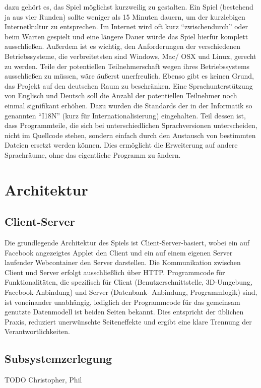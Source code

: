 \documentclass[a4paper,12pt]{scrartcl}
\begin{document}
dazu gehört es, das Spiel möglichst kurzweilig zu gestalten. Ein Spiel (bestehend ja aus
vier Runden) sollte weniger als 15 Minuten dauern, um der kurzlebigen Internetkultur zu
entsprechen. Im Internet wird oft kurz "`zwischendurch"' oder beim Warten gespielt und eine
längere Dauer würde das Spiel hierfür komplett ausschließen. Außerdem ist es wichtig, den
Anforderungen der verschiedenen Betriebssysteme, die verbreitetsten sind Windows, Mac/
OSX und Linux, gerecht zu werden. Teile der potentiellen Teilnehmerschaft wegen ihres
Betriebssystems ausschließen zu müssen, wäre äußerst unerfreulich. Ebenso gibt es keinen
Grund, das Projekt auf den deutschen Raum zu beschränken. Eine Sprachunterstützung
von Englisch und Deutsch soll die Anzahl der potentiellen Teilnehmer noch einmal
signifikant erhöhen. Dazu wurden die Standards der in der Informatik so genannten "`I18N"'
(kurz für Internationalisierung) eingehalten. Teil dessen ist, dass Programmteile, die sich
bei unterschiedlichen Sprachversionen unterscheiden, nicht im Quellcode stehen, sondern
einfach durch den Austausch von bestimmten Dateien ersetzt werden können. Dies
ermöglicht die Erweiterung auf andere Sprachräume, ohne das eigentliche Programm zu
ändern.

\section{Architektur}
\subsection{Client-Server}
Die grundlegende Architektur des Spiels ist Client-Server-basiert, wobei ein auf
Facebook angezeigtes Applet den Client und ein auf einem eigenen Server laufender
Webcontainer den Server darstellen. Die Kommunikation zwischen Client und Server erfolgt
ausschließlich über HTTP. Programmcode für Funktionalitäten, die spezifisch für Client
(Benutzerschnittstelle, 3D-Umgebung, Facebook-Anbindung) und Server (Datenbank-
Anbindung, Programmlogik) sind, ist voneinander unabhängig, lediglich der Programmcode
für das gemeinsam genutzte Datenmodell ist beiden Seiten bekannt. Dies entspricht der
üblichen Praxis, reduziert unerwünschte Seiteneffekte und ergibt eine klare Trennung der
Verantwortlichkeiten.

\subsection{Subsystemzerlegung}
TODO Christopher, Phil
\end{document}
